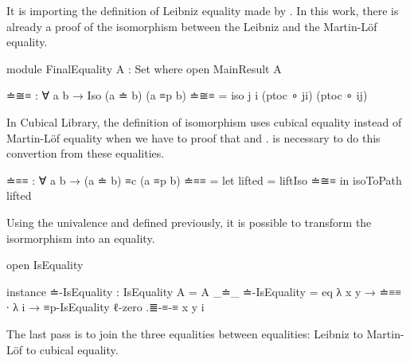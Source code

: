 \documentclass{article}
\begin{document}
It is importing the definition of Leibniz equality made by \cite{abel2020leibniz}.
In this work, there is already a proof of the isomorphism between the Leibniz and the Martin-Löf equality.

\begin{code}
module FinalEquality {A : Set} where
  open MainResult A

  ≐≅≡ : ∀ {a b} → Iso (a ≐ b) (a ≡p b)
  ≐≅≡ = iso j i (ptoc ∘ ji) (ptoc ∘ ij)
\end{code}

In Cubical Library, the definition of isomorphism uses cubical equality instead of Martin-Löf equality
when we have to proof that  and .
 is necessary to do this convertion from these equalities.

\begin{code}
  ≐≡≡ : ∀ {a b} → (a ≐ b) ≡c (a ≡p b)
  ≐≡≡ = let lifted = liftIso ≐≅≡  in isoToPath lifted
\end{code}

Using the univalence and  defined previously, it is possible to transform the isormorphism
into an equality.

\begin{code}
  open IsEquality

  instance
    ≐-IsEquality : IsEquality {A = A} _≐_
    ≐-IsEquality = eq λ {x} {y} → ≐≡≡ ∙
      λ i → ≡p-IsEquality {ℓ-zero} .≣-≡-≡ {x} {y} i
\end{code}

The last pass is to join the three equalities between equalities:
Leibniz to Martin-Löf to cubical equality.
\end{document}
